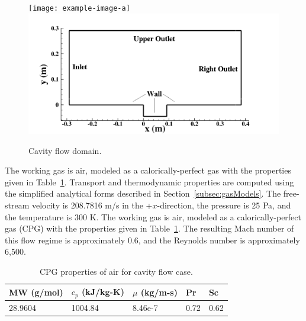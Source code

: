 \begin{figure}
    \centering
	\ifdefined\DRAFT
		\texttt{[image: example-image-a]}
	\else
    	\includegraphics[width=0.9\linewidth]{Chapters/CavityAndCVRC/Images/cavity/geom.png}
	\fi
    \caption{\label{fig:cavityGeom} Cavity flow domain.}
\end{figure}

The working gas is air, modeled as a calorically-perfect gas with the properties given in Table~\ref{tab:airProps}. Transport and thermodynamic properties are computed using the simplified analytical forms described in Section~\ref{subsec:gasModels}. The free-stream velocity is 208.7816 m/s in the +$x$-direction, the pressure is 25 Pa, and the temperature is 300 K. The working gas is air, modeled as a calorically-perfect gas (CPG) with the properties given in Table~\ref{tab:airProps}. The resulting Mach number of this flow regime is approximately 0.6, and the Reynolds number is approximately 6,500.

\begin{table}
	\centering
	\begin{tabular}{ lllll }
	\toprule
	MW (g/mol) & $c_p$ (kJ/kg-K) & $\mu$ (kg/m-s) & Pr & Sc   \\
	\midrule
	28.9604 & 1004.84 & 8.46e-7 & 0.72 & 0.62 \\
	\bottomrule
	\end{tabular}
	\caption{\label{tab:airProps}CPG properties of air for cavity flow case.}
\end{table}

